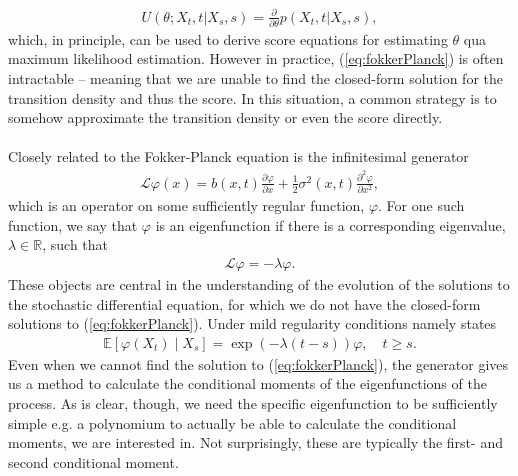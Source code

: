 \begin{align}
    U(\theta; X_t, t | X_s, s) = \frac{\partial}{\partial\theta}p(X_t, t | X_s, s), \label{eq:transitionScore}
\end{align}
which, in principle, can be used to derive score equations for estimating $\theta$ qua maximum likelihood estimation. However in practice, (\ref{eq:fokkerPlanck}) is often intractable – meaning that we are unable to find the closed-form solution for the transition density and thus the score. In this situation, a common strategy is to somehow approximate the transition density or even the score directly. \\\\
Closely related to the Fokker-Planck equation is the infinitesimal generator 
\begin{align}
    \mathcal{L}\varphi(x) = b(x, t) \frac{\partial\varphi}{\partial x} + \frac{1}{2}\sigma^2(x, t)\frac{\partial^2\varphi}{\partial x^2} \label{eq:infinitesemalGeneratorDefinition},
\end{align}
which is an operator on some sufficiently regular function, $\varphi$. For one such function, we say that $\varphi$ is an eigenfunction if there is a corresponding eigenvalue, $\lambda\in\mathbb{R}$, such that
\begin{align}
    \mathcal{L}\varphi = -\lambda\varphi.
\end{align} 
These objects are central in the understanding of the evolution of the solutions to the stochastic differential equation, for which we do not have the closed-form solutions to (\ref{eq:fokkerPlanck}). Under mild regularity conditions \cite[theorem 1.16]{StatisticalMethodsForSDE} namely states
\begin{align}
    \mathbb{E}\left[\varphi(X_{t}) \middle | X_{s}\right] = \exp\left(-\lambda \left(t - s\right)\right)\varphi \label{eq:momentConditions}, \quad t\geq s.
\end{align}
Even when we cannot find the solution to (\ref{eq:fokkerPlanck}), the generator gives us a method to calculate the conditional moments of the eigenfunctions of the process.
As is clear, though, we need the specific eigenfunction to be sufficiently simple e.g. a polynomium to actually be able to calculate the conditional moments, we are interested in. Not surprisingly, these are typically the first- and second conditional moment.
